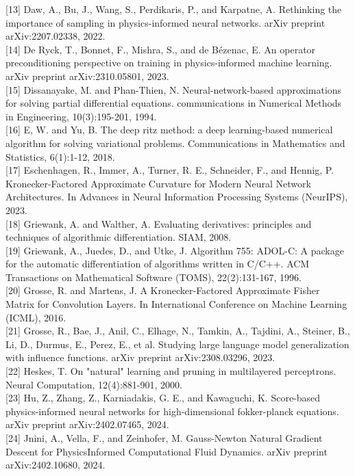 \documentclass[10pt]{article}
\begin{document}
[13] Daw, A., Bu, J., Wang, S., Perdikaris, P., and Karpatne, A. Rethinking the importance of sampling in physics-informed neural networks. arXiv preprint arXiv:2207.02338, 2022.\\[0pt]
[14] De Ryck, T., Bonnet, F., Mishra, S., and de Bézenac, E. An operator preconditioning perspective on training in physics-informed machine learning. arXiv preprint arXiv:2310.05801, 2023.\\[0pt]
[15] Dissanayake, M. and Phan-Thien, N. Neural-network-based approximations for solving partial differential equations. communications in Numerical Methods in Engineering, 10(3):195-201, 1994.\\[0pt]
[16] E, W. and Yu, B. The deep ritz method: a deep learning-based numerical algorithm for solving variational problems. Communications in Mathematics and Statistics, 6(1):1-12, 2018.\\[0pt]
[17] Eschenhagen, R., Immer, A., Turner, R. E., Schneider, F., and Hennig, P. Kronecker-Factored Approximate Curvature for Modern Neural Network Architectures. In Advances in Neural Information Processing Systems (NeurIPS), 2023.\\[0pt]
[18] Griewank, A. and Walther, A. Evaluating derivatives: principles and techniques of algorithmic differentiation. SIAM, 2008.\\[0pt]
[19] Griewank, A., Juedes, D., and Utke, J. Algorithm 755: ADOL-C: A package for the automatic differentiation of algorithms written in C/C++. ACM Transactions on Mathematical Software (TOMS), 22(2):131-167, 1996.\\[0pt]
[20] Grosse, R. and Martens, J. A Kronecker-Factored Approximate Fisher Matrix for Convolution Layers. In International Conference on Machine Learning (ICML), 2016.\\[0pt]
[21] Grosse, R., Bae, J., Anil, C., Elhage, N., Tamkin, A., Tajdini, A., Steiner, B., Li, D., Durmus, E., Perez, E., et al. Studying large language model generalization with influence functions. arXiv preprint arXiv:2308.03296, 2023.\\[0pt]
[22] Heskes, T. On "natural" learning and pruning in multilayered perceptrons. Neural Computation, 12(4):881-901, 2000.\\[0pt]
[23] Hu, Z., Zhang, Z., Karniadakis, G. E., and Kawaguchi, K. Score-based physics-informed neural networks for high-dimensional fokker-planck equations. arXiv preprint arXiv:2402.07465, 2024.\\[0pt]
[24] Jnini, A., Vella, F., and Zeinhofer, M. Gauss-Newton Natural Gradient Descent for PhysicsInformed Computational Fluid Dynamics. arXiv preprint arXiv:2402.10680, 2024.\\[0pt]
\end{document}
